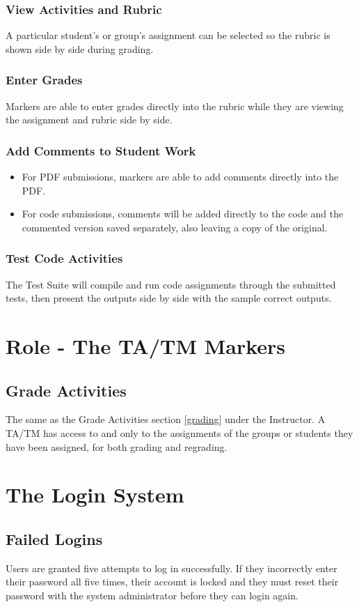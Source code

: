 \documentclass{article}
\begin{document}
\subsubsection{View Activities and Rubric}
A particular student's or group's assignment can be selected so the rubric is
shown side by side during grading.
\subsubsection{Enter Grades}
Markers are able to enter grades directly into the rubric while they are viewing
the assignment and rubric side by side.
\subsubsection{Add Comments to Student Work}
\begin {itemize}
	\item For PDF submissions, markers are able to add comments directly into the PDF.
	\item For code submissions, comments will be added directly to the code 
and the commented version saved separately, also leaving a copy of the original.
\end {itemize}
\subsubsection{Test Code Activities}
The Test Suite will compile and run code assignments through the submitted tests,
then present the outputs side by side with the sample correct outputs.

\section{Role - The TA/TM Markers \label{Marker}}
\subsection{Grade Activities}
The same as the Grade Activities section \ref {grading} under the Instructor.
A TA/TM has access to and only to the assignments of the groups or students they
have been assigned, for both grading and regrading.

\section{The Login System}
\subsection{Failed Logins \label{loginSystem1}}
Users are granted five attempts to log in successfully.  If they incorrectly
enter their password all five times, their account is locked and they must reset
their password with the system administrator before they can login again.
\end{document}
